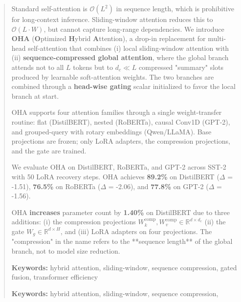 \documentclass[10pt,twocolumn,letterpaper]{article}
\begin{document}
\maketitle

\begin{abstract}
Standard self-attention is $\mathcal{O}(L^2)$ in sequence length, which is 
prohibitive for long-context inference. Sliding-window attention reduces 
this to $\mathcal{O}(L \cdot W)$, but cannot capture long-range dependencies. 
We introduce \textbf{OHA} (\textbf{O}ptimized \textbf{H}ybrid \textbf{A}ttention), a drop-in 
replacement for multi-head self-attention that combines (i) local sliding-window 
attention with (ii) \textbf{sequence-compressed global attention}, where the 
global branch attends not to all $L$ tokens but to $d_c \ll L$ compressed 
"summary" slots produced by learnable soft-attention weights. The two 
branches are combined through a \textbf{head-wise gating} scalar initialized to 
favor the local branch at start.

OHA supports four attention families through a single weight-transfer routine: 
flat (DistilBERT), nested (RoBERTa), causal Conv1D (GPT-2), and grouped-query 
with rotary embeddings (Qwen/LLaMA). Base projections are frozen; only LoRA 
adapters, the compression projections, and the gate are trained.

We evaluate OHA on DistilBERT, RoBERTa, and GPT-2 across SST-2 with 
50 LoRA recovery steps. OHA achieves \textbf{89.2\%} on 
DistilBERT ($\Delta$ = -1.51), \textbf{76.5\%} on RoBERTa ($\Delta$ = -2.06), 
and \textbf{77.8\%} on GPT-2 ($\Delta$ = -1.56).

OHA \textbf{increases} parameter count by \textbf{1.40\%} on DistilBERT 
due to three additions: (i) the compression projections 
$W_k^\text{comp}, W_v^\text{comp} \in \mathbb{R}^{d \times d_c}$ 
(ii) the gate $W_g \in \mathbb{R}^{d \times H}$, and (iii) LoRA adapters on 
four projections. The "compression" in the name refers to the **sequence 
length** of the global branch, not to model size reduction.

\textbf{Keywords:} hybrid attention, sliding-window, sequence compression, 
gated fusion, transformer efficiency



\vspace{0.5em}
\noindent\textbf{Keywords:} hybrid attention, sliding-window, sequence compression,
\end{abstract}
\end{document}
